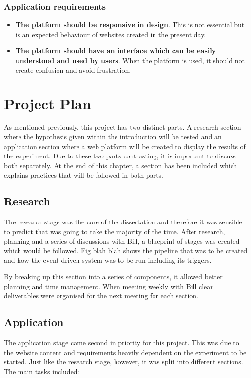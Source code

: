 \documentclass[a4paper,11pt]{report}
\begin{document}
\subsection{Application requirements}
\begin{itemize}
    \item \textbf{The platform should be responsive in design}. This is not essential but is an expected behaviour of websites created in the present day.
    \item \textbf{The platform should have an interface which can be easily understood and used by users}. When the platform is used, it should not create confusion and avoid frustration.
\end{itemize}

\chapter{Project Plan}
As mentioned previously, this project has two distinct parts. A research section where the hypothesis given within the introduction will be tested and an application section where a web platform will be created to display the results of the experiment. Due to these two parts contrasting, it is important to discuss both separately. At the end of this chapter, a section has been included which explains practices that will be followed in both parts.

\section{Research}
The research stage was the core of the dissertation and therefore it was sensible to predict that was going to take the majority of the time. After research, planning and a series of discussions with Bill, a blueprint of stages was created which would be followed. Fig blah blah shows the pipeline that was to be created and how the event-driven system was to be run including its triggers.

By breaking up this section into a series of components, it allowed better planning and time management. When meeting weekly with Bill clear deliverables were organised for the next meeting for each section.

\section{Application}
The application stage came second in priority for this project. This was due to the website content and requirements heavily dependent on the experiment to be started. Just like the research stage, however, it was split into different sections. The main tasks included:
\end{document}
